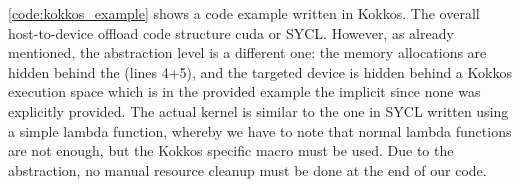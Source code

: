 \autoref{code:kokkos_example} shows a code example written in Kokkos. 
The overall host-to-device offload code structure \gls{cuda} or SYCL. 
However, as already mentioned, the abstraction level is a different one: the memory allocations are hidden behind the  (lines 4+5), and the targeted device is hidden behind a Kokkos execution space which is in the provided example the implicit  since none was explicitly provided.  
The actual kernel is similar to the one in SYCL written using a simple lambda function, whereby we have to note that normal \cpp lambda functions are not enough, but the Kokkos specific  macro must be used. 
Due to the  abstraction, no manual resource cleanup must be done at the end of our code. 

